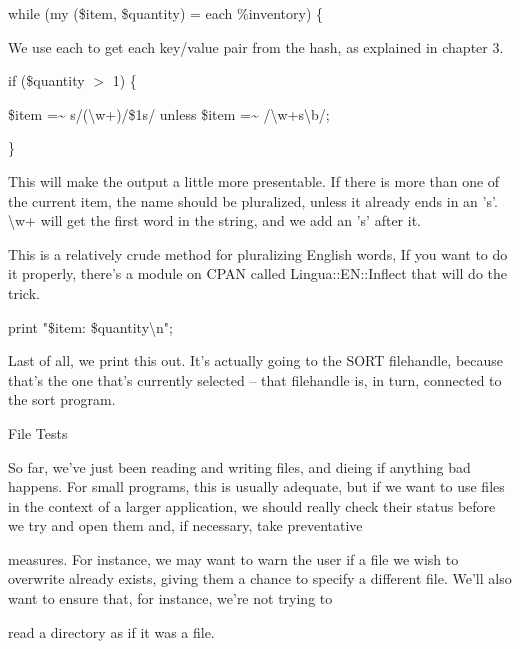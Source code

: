 \documentclass[a4paper,11pt]{book}
\begin{document}
\noindent while (my (\$item, \$quantity) = each \%inventory) \{

\noindent 

\noindent We use each to get each key/value pair from the hash, as explained in chapter 3.

\noindent 

\noindent 

\noindent if (\$quantity $>$ 1) \{

\noindent \$item =\~{} s/(\textbackslash w+)/\$1s/ unless \$item =\~{} /\textbackslash w+s\textbackslash b/;

\noindent \}

\noindent 

\noindent This will make the output a little more presentable.  If there is more than one of the current item, the name should be pluralized, unless it already ends in an 's'. \textbackslash w+ will get the first word in the string, and we add an 's' after it.

\noindent 

\noindent This is a relatively crude method for pluralizing English words, If you want to do it properly, there's a module on CPAN called Lingua::EN::Inflect that will do the trick.

\noindent 

\noindent print "\$item: \$quantity\textbackslash n";

\noindent 

\noindent Last of all, we print this out. It's actually going to the SORT filehandle, because that's the one that's currently selected -- that filehandle is, in turn, connected to the sort program.

\noindent 

\noindent 

\noindent File Tests

\noindent 

\noindent So far, we've just been reading and writing files, and dieing if anything bad happens. For small programs, this is usually adequate, but if we want to use files in the context of a larger application, we should really check their status before we try and open them and, if necessary, take preventative

\noindent measures. For instance, we may want to warn the user if a file we wish to overwrite already exists, giving them a chance to specify a different file. We'll also want to ensure that, for instance, we're not trying to

\noindent read a directory as if it was a file.
\end{document}
